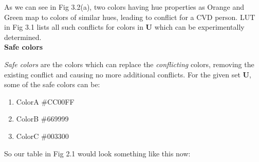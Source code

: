 As we can see in Fig 3.2(a), two colors having hue properties as Orange and Green map to colors of similar hues, leading to conflict for a CVD person. LUT in Fig 3.1 lists all such conflicts for colors in \textbf{U} which can be experimentally determined.   \\ 



\textbf{Safe colors}


\textit{Safe colors} are the colors which can replace the \textit{conflicting} colors, removing the existing conflict and causing no more additional conflicts. For the given set \textbf{U}, some of the safe colors can be:

\begin{enumerate}
    \item ColorA \#CC00FF
	\item ColorB \#669999
	\item ColorC \#003300
\end{enumerate} 


So our table in Fig 2.1 would look something like this now:

\label{Tick}

